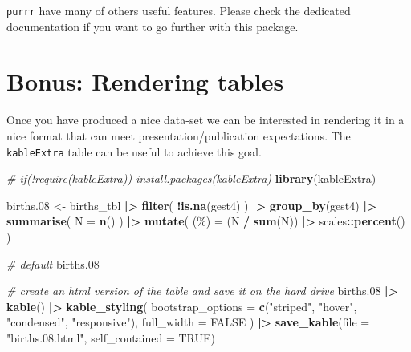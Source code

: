 \documentclass[
]{book}
\newenvironment{Shaded}{\begin{snugshade}}{\end{snugshade}}
\newcommand{\AttributeTok}[1]{\textcolor[rgb]{0.13,0.29,0.53}{#1}}
\newcommand{\CommentTok}[1]{\textcolor[rgb]{0.56,0.35,0.01}{\textit{#1}}}
\newcommand{\ConstantTok}[1]{\textcolor[rgb]{0.56,0.35,0.01}{#1}}
\newcommand{\FloatTok}[1]{\textcolor[rgb]{0.00,0.00,0.81}{#1}}
\newcommand{\FunctionTok}[1]{\textcolor[rgb]{0.13,0.29,0.53}{\textbf{#1}}}
\newcommand{\NormalTok}[1]{#1}
\newcommand{\OtherTok}[1]{\textcolor[rgb]{0.56,0.35,0.01}{#1}}
\newcommand{\SpecialCharTok}[1]{\textcolor[rgb]{0.81,0.36,0.00}{\textbf{#1}}}
\newcommand{\StringTok}[1]{\textcolor[rgb]{0.31,0.60,0.02}{#1}}
\begin{document}
\texttt{purrr} have many of others useful features. Please check the dedicated documentation if you want to go further with this package.

\section{Bonus: Rendering tables}\label{bonus-rendering-tables}

Once you have produced a nice data-set we can be interested in rendering it in a nice format that can meet presentation/publication expectations. The \texttt{kableExtra} table can be useful to achieve this goal.

\begin{Shaded}
\begin{Highlighting}[]
\CommentTok{\# if(!require(kableExtra)) install.packages(\textquotesingle{}kableExtra\textquotesingle{})}
\FunctionTok{library}\NormalTok{(kableExtra)}

\NormalTok{births}\FloatTok{.08} \OtherTok{\textless{}{-}}
\NormalTok{  births\_tbl }\SpecialCharTok{|\textgreater{}}
  \FunctionTok{filter}\NormalTok{(}
    \SpecialCharTok{!}\FunctionTok{is.na}\NormalTok{(gest4)}
\NormalTok{  ) }\SpecialCharTok{|\textgreater{}}
  \FunctionTok{group\_by}\NormalTok{(gest4) }\SpecialCharTok{|\textgreater{}}
  \FunctionTok{summarise}\NormalTok{(}
    \AttributeTok{N =} \FunctionTok{n}\NormalTok{()}
\NormalTok{  ) }\SpecialCharTok{|\textgreater{}}
  \FunctionTok{mutate}\NormalTok{(}
    \StringTok{\textasciigrave{}}\AttributeTok{(\%)}\StringTok{\textasciigrave{}} \OtherTok{=}\NormalTok{ (N }\SpecialCharTok{/} \FunctionTok{sum}\NormalTok{(N)) }\SpecialCharTok{|\textgreater{}}\NormalTok{ scales}\SpecialCharTok{::}\FunctionTok{percent}\NormalTok{()}
\NormalTok{  )}

\CommentTok{\# default}
\NormalTok{births}\FloatTok{.08}

\CommentTok{\# create an html version of the table and save it on the hard drive}
\NormalTok{births}\FloatTok{.08} \SpecialCharTok{|\textgreater{}}
  \FunctionTok{kable}\NormalTok{() }\SpecialCharTok{|\textgreater{}}
  \FunctionTok{kable\_styling}\NormalTok{(}
    \AttributeTok{bootstrap\_options =} 
      \FunctionTok{c}\NormalTok{(}\StringTok{"striped"}\NormalTok{, }\StringTok{"hover"}\NormalTok{, }\StringTok{"condensed"}\NormalTok{, }\StringTok{"responsive"}\NormalTok{),}
    \AttributeTok{full\_width =} \ConstantTok{FALSE}
\NormalTok{  ) }\SpecialCharTok{|\textgreater{}}
  \FunctionTok{save\_kable}\NormalTok{(}\AttributeTok{file =} \StringTok{"births.08.html"}\NormalTok{, }\AttributeTok{self\_contained =} \ConstantTok{TRUE}\NormalTok{)}
\end{Highlighting}
\end{Shaded}
\end{document}
